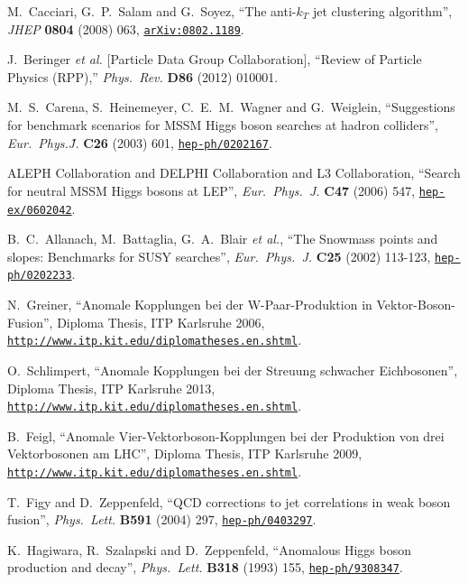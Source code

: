 \documentclass[english,12pt]{article}
\begin{document}
\begin{thebibliography}{10}
  M.~Cacciari, G.~P.~Salam and G.~Soyez,
  ``The anti-$k_T$ jet clustering algorithm'',
  {\em JHEP} {\bf 0804} (2008) 063,
  \href{http://arxiv.org/abs/0802.1189}{{\tt arXiv:0802.1189}}.

  J.~Beringer {\it et al.}  [Particle Data Group Collaboration],
  ``Review of Particle Physics (RPP),''
   {\em Phys.\ Rev.} {\bf D86} (2012) 010001.

  M.~S.~Carena, S.~Heinemeyer, C.~E.~M.~Wagner and G.~Weiglein,
  ``Suggestions for benchmark scenarios for MSSM Higgs boson searches at
  hadron colliders'',
  {\em Eur.\ Phys.\~J.} {\bf C26} (2003) 601,
\href{http://www.arXiv.org/abs/hep-ph/0202167}{{\tt hep-ph/0202167}}.

  ALEPH Collaboration and DELPHI Collaboration and L3 Collaboration,
  ``Search for neutral MSSM Higgs bosons at LEP'',
  {\em Eur.\ Phys.\ J.} {\bf C47} (2006) 547,
\href{http://www.arXiv.org/abs/hep-ex/0602042}{{\tt hep-ex/0602042}}.

  B.~C.~Allanach, M.~Battaglia, G.~A.~Blair {\it et al.},
  ``The Snowmass points and slopes: Benchmarks for SUSY searches'',
  {\em Eur.\ Phys.\ J.}  {\bf C25} (2002) 113-123,
\href{http://www.arXiv.org/abs/hep-ph/0202233}{{\tt hep-ph/0202233}}.
  
N.~Greiner, ``Anomale Kopplungen bei der W-Paar-Produktion in
  Vektor-Boson-Fusion'', {Diploma Thesis, ITP Karlsruhe 2006},
\href{http://www.itp.kit.edu/diplomatheses.en.shtml}{{\tt http://www.itp.kit.edu/diplomatheses.en.shtml}}.

O.~Schlimpert, ``Anomale Kopplungen bei der Streuung schwacher
Eichbosonen'', {Diploma Thesis, ITP Karlsruhe 2013}, 
\href{http://www.itp.kit.edu/diplomatheses.en.shtml}{{\tt http://www.itp.kit.edu/diplomatheses.en.shtml}}.

B.~Feigl, ``Anomale Vier-Vektorboson-Kopplungen bei der Produktion von drei 
    Vektorbosonen am LHC'', {Diploma Thesis, ITP Karlsruhe 2009}, 
\href{http://www.itp.kit.edu/diplomatheses.en.shtml}{{\tt http://www.itp.kit.edu/diplomatheses.en.shtml}}.

T.~Figy and D.~Zeppenfeld, ``{QCD corrections to jet correlations in weak boson
  fusion}'', {\em Phys.\ Lett.} {\bf B591} (2004) 297,
\href{http://www.arXiv.org/abs/hep-ph/0403297}{{\tt hep-ph/0403297}}.

K.~Hagiwara, R.~Szalapski and D.~Zeppenfeld, ``{Anomalous Higgs boson
  production and decay}'', {\em Phys.\ Lett.} {\bf B318} (1993) 155,
\href{http://www.arXiv.org/abs/hep-ph/9308347}{{\tt hep-ph/9308347}}.


\end{thebibliography}
\end{document}
